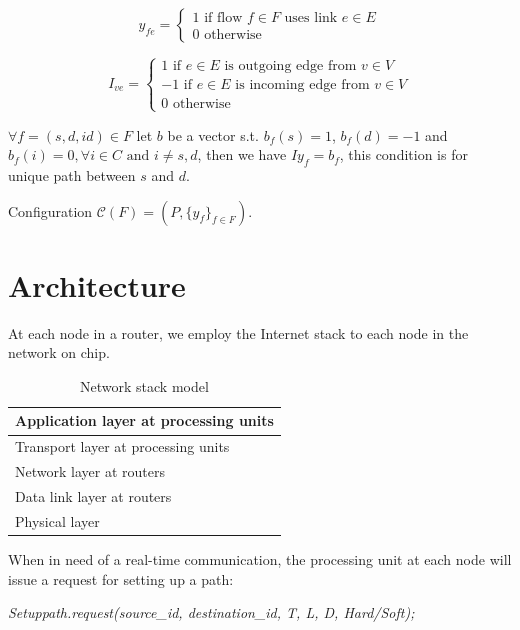 \documentclass[10pt]{article}
\begin{document}
\begin{equation}
y_{fe} = \left\{ \begin{array}{lrc}
1 \mbox{ if flow } f \in F \mbox{ uses link } e \in E \\
0 \mbox{ otherwise} 
\end{array}\right.
\end{equation}

\begin{equation}
I_{ve} = \left\{ \begin{array}{lrc}
1 \mbox{ if } e \in E \mbox{ is outgoing edge from } v \in V \\
-1 \mbox{ if } e \in E \mbox{ is incoming edge from } v \in V \\
0 \mbox{ otherwise}
\end{array}\right. 
\end{equation}

$\forall f=(s, d, id) \in F$  let $b$ be a vector s.t. $b_f(s) = 1$, 
$b_f(d) = -1$ and $b_f(i) = 0, \forall i \in C \mbox{ and } i \neq s, d$,
 then we have $Iy_f=b_f$, this condition is for unique path between $s$ and $d$.

Configuration $\mathcal{C}(F)=(P, \{y_f\}_{f \in F})$.
\section{Architecture}
At each node in a router, we employ the Internet stack to each node in the 
network on chip.
\begin{table}[h]
\begin{center}
  \begin{tabular}{ | l | }
    \hline
    Application layer at processing units \\ \hline
    Transport layer at processing units \\ \hline
    Network layer at routers \\ \hline
	Data link layer at routers \\ \hline
	Physical layer \\
    \hline
  \end{tabular}
\end{center}
\caption{Network stack model}
\label{table:NetworkStack}
\end{table}

When in need of a real-time communication, the processing unit at each node 
will issue a request for setting up a path:

{\em Setuppath.request(source\_id, destination\_id, T, L, D, Hard/Soft);}
\end{document}
